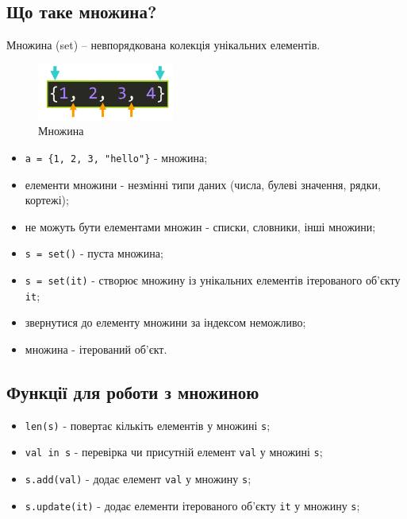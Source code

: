  \subsection{Що таке множина?} 
\begin{frame}
Множина (set) – невпорядкована колекція унікальних елементів.

\begin{figure}
\begin{center}
 \includegraphics[width=0.4\textwidth]{pictures/set.png}
\caption{Множина}
\label{set} 
\end{center}
\end{figure}

\end{frame}

\begin{frame}
\begin{itemize}
  \item \texttt{a = \{1, 2, 3, "hello"\}} - множина;
  \item елементи множини - незмінні типи даних (числа, булеві значення, рядки, кортежі);
  \item не можуть бути елементами множин - списки, словники, інші множини;
  \item \texttt{s = set()} - пуста множина;
  \item \texttt{s = set(it)} - створює множину із унікальних елементів ітерованого об'єкту \texttt{it};
  \item звернутися до елементу множини за індексом неможливо;
  \item множина - ітерований об'єкт.
\end{itemize}

\end{frame}

 \subsection{Функції для роботи з множиною} 
\begin{frame}
\begin{itemize}
  \item \texttt{len(s)} - повертає кількіть елементів у множині \texttt{s};
  \item \texttt{val in s} - перевірка чи присутній елемент \texttt{val} у множині \texttt{s};
  \item \texttt{s.add(val)} - додає елемент \texttt{val} у множину \texttt{s};
  \item \texttt{s.update(it)} - додає елементи ітерованого об'єкту \texttt{it} у множину \texttt{s};
\end{itemize}
\end{frame}

